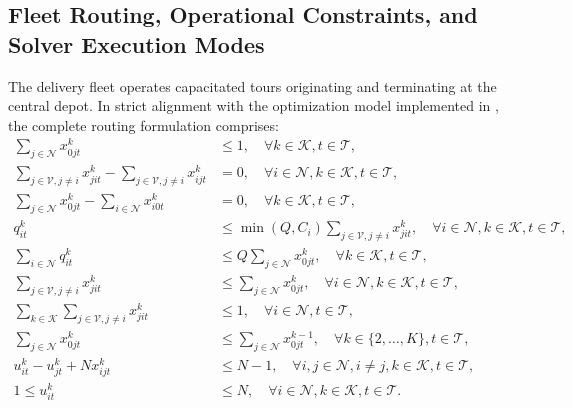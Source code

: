 \documentclass[11pt,a4paper]{article}
\theoremstyle{definition}
\theoremstyle{remark}
\begin{document}
\subsection{Fleet Routing, Operational Constraints, and Solver Execution Modes}
\label{subsec:routing_constraints}
The delivery fleet operates capacitated tours originating and terminating at the central depot. In strict alignment with the optimization model implemented in , the complete routing formulation comprises:
\begin{align}
    \sum_{j \in \mathcal{N}} x_{0jt}^k &\le 1, \quad \forall k \in \mathcal{K}, t \in \mathcal{T}, \label{eq:depot_depart} \\
    \sum_{j \in \mathcal{V}, j \neq i} x_{jit}^k - \sum_{j \in \mathcal{V}, j \neq i} x_{ijt}^k &= 0, \quad \forall i \in \mathcal{N}, k \in \mathcal{K}, t \in \mathcal{T}, \label{eq:flow_cons} \\
    \sum_{j \in \mathcal{N}} x_{0jt}^k - \sum_{i \in \mathcal{N}} x_{i0t}^k &= 0, \quad \forall k \in \mathcal{K}, t \in \mathcal{T}, \label{eq:depot_return} \\
    q_{it}^k &\le \min(Q, C_i) \sum_{j \in \mathcal{V}, j \neq i} x_{jit}^k, \quad \forall i \in \mathcal{N}, k \in \mathcal{K}, t \in \mathcal{T}, \label{eq:visit_link} \\
    \sum_{i \in \mathcal{N}} q_{it}^k &\le Q \sum_{j \in \mathcal{N}} x_{0jt}^k, \quad \forall k \in \mathcal{K}, t \in \mathcal{T}, \label{eq:veh_capacity} \\
    \sum_{j \in \mathcal{V}, j \neq i} x_{jit}^k &\le \sum_{j \in \mathcal{N}} x_{0jt}^k, \quad \forall i \in \mathcal{N}, k \in \mathcal{K}, t \in \mathcal{T}, \label{eq:visit_depot_link} \\
    \sum_{k \in \mathcal{K}} \sum_{j \in \mathcal{V}, j \neq i} x_{jit}^k &\le 1, \quad \forall i \in \mathcal{N}, t \in \mathcal{T}, \label{eq:single_visit} \\
    \sum_{j \in \mathcal{N}} x_{0jt}^k &\le \sum_{j \in \mathcal{N}} x_{0jt}^{k-1}, \quad \forall k \in \{2, \dots, K\}, t \in \mathcal{T}, \label{eq:sym_break} \\
    u_{it}^k - u_{jt}^k + N x_{ijt}^k &\le N - 1, \quad \forall i, j \in \mathcal{N}, i \neq j, k \in \mathcal{K}, t \in \mathcal{T}, \label{eq:mtz_subtour} \\
    1 \le u_{it}^k &\le N, \quad \forall i \in \mathcal{N}, k \in \mathcal{K}, t \in \mathcal{T}. \label{eq:mtz_bounds}
\end{align}
\end{document}
